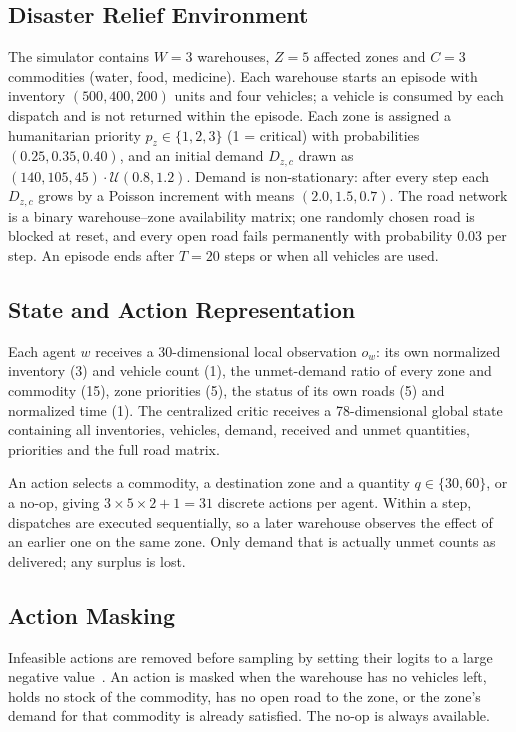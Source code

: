 \documentclass[conference]{IEEEtran}
\begin{document}
\subsection{Disaster Relief Environment}
The simulator contains $W=3$ warehouses, $Z=5$ affected zones and $C=3$ commodities (water, food, medicine). Each warehouse starts an episode with inventory $(500, 400, 200)$ units and four vehicles; a vehicle is consumed by each dispatch and is not returned within the episode. Each zone is assigned a humanitarian priority $p_z\in\{1,2,3\}$ (1 = critical) with probabilities $(0.25, 0.35, 0.40)$, and an initial demand $D_{z,c}$ drawn as $(140, 105, 45)\cdot\mathcal{U}(0.8, 1.2)$. Demand is non-stationary: after every step each $D_{z,c}$ grows by a Poisson increment with means $(2.0, 1.5, 0.7)$. The road network is a binary warehouse--zone availability matrix; one randomly chosen road is blocked at reset, and every open road fails permanently with probability $0.03$ per step. An episode ends after $T=20$ steps or when all vehicles are used.

\subsection{State and Action Representation}
Each agent $w$ receives a 30-dimensional local observation $o_w$: its own normalized inventory (3) and vehicle count (1), the unmet-demand ratio of every zone and commodity (15), zone priorities (5), the status of its own roads (5) and normalized time (1). The centralized critic receives a 78-dimensional global state containing all inventories, vehicles, demand, received and unmet quantities, priorities and the full road matrix.

An action selects a commodity, a destination zone and a quantity $q\in\{30, 60\}$, or a no-op, giving $3\times5\times2+1=31$ discrete actions per agent. Within a step, dispatches are executed sequentially, so a later warehouse observes the effect of an earlier one on the same zone. Only demand that is actually unmet counts as delivered; any surplus is lost.

\subsection{Action Masking}
\label{sec:mask}
Infeasible actions are removed before sampling by setting their logits to a large negative value~\cite{b9}. An action is masked when the warehouse has no vehicles left, holds no stock of the commodity, has no open road to the zone, or the zone's demand for that commodity is already satisfied. The no-op is always available.
\end{document}
